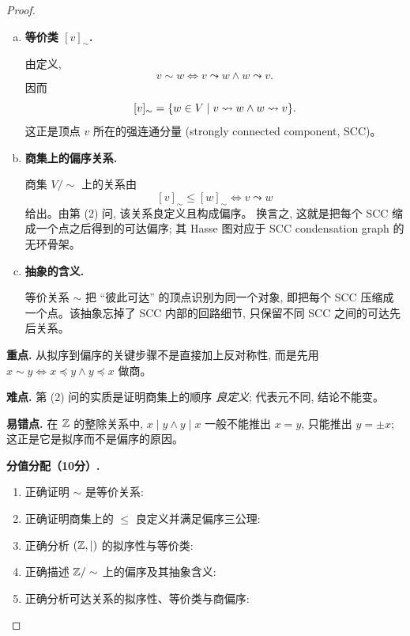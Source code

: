 \documentclass[a4paper, justified]{tufte-handout}
\begin{document}
\begin{proof}
\begin{enumerate}[(1)]
\begin{enumerate}[(a)]
          因而 $\leadsto$ 是拟序。

        \item \textbf{等价类 $[v]_{\sim}$.}

          由定义,
          \[
            v \sim w
            \iff v \leadsto w \land w \leadsto v.
          \]
          因而
          \[
            [v]_{\sim} = \{w \in V \mid v \leadsto w \land w \leadsto v\}.
          \]
          这正是顶点 $v$ 所在的强连通分量 (strongly connected component, SCC)。

        \item \textbf{商集上的偏序关系.}

          商集 $V/\sim$ 上的关系由
          \[
            [v]_{\sim} \le [w]_{\sim}
            \iff v \leadsto w
          \]
          给出。由第 (2) 问, 该关系良定义且构成偏序。
          换言之, 这就是把每个 SCC 缩成一个点之后得到的可达偏序;
          其 Hasse 图对应于 SCC condensation graph 的无环骨架。

        \item \textbf{抽象的含义.}

          等价关系 $\sim$ 把 ``彼此可达'' 的顶点识别为同一个对象, 即把每个 SCC 压缩成一个点。该抽象忘掉了 SCC 内部的回路细节, 只保留不同 SCC 之间的可达先后关系。
      \end{enumerate}
  \end{enumerate}

  \begin{remark}
    \textbf{重点.} 从拟序到偏序的关键步骤不是直接加上反对称性, 而是先用
    $x \sim y \iff x \preceq y \land y \preceq x$
    做商。\par
    \textbf{难点.} 第 (2) 问的实质是证明商集上的顺序 \emph{良定义}; 代表元不同, 结论不能变。\par
    \textbf{易错点.} 在 $\mathbb{Z}$ 的整除关系中, $x \mid y \land y \mid x$ 一般不能推出 $x = y$, 只能推出 $y = \pm x$; 这正是它是拟序而不是偏序的原因。
  \end{remark}

  \textbf{分值分配（10分）.}
  \begin{enumerate}[(1)]
    \item 正确证明 $\sim$ 是等价关系: 
    \item 正确证明商集上的 $\le$ 良定义并满足偏序三公理: 
    \item 正确分析 $(\mathbb{Z}, \mid)$ 的拟序性与等价类: 
    \item 正确描述 $\mathbb{Z}/\sim$ 上的偏序及其抽象含义: 
    \item 正确分析可达关系的拟序性、等价类与商偏序: 
  \end{enumerate}
\end{proof}
\end{document}
